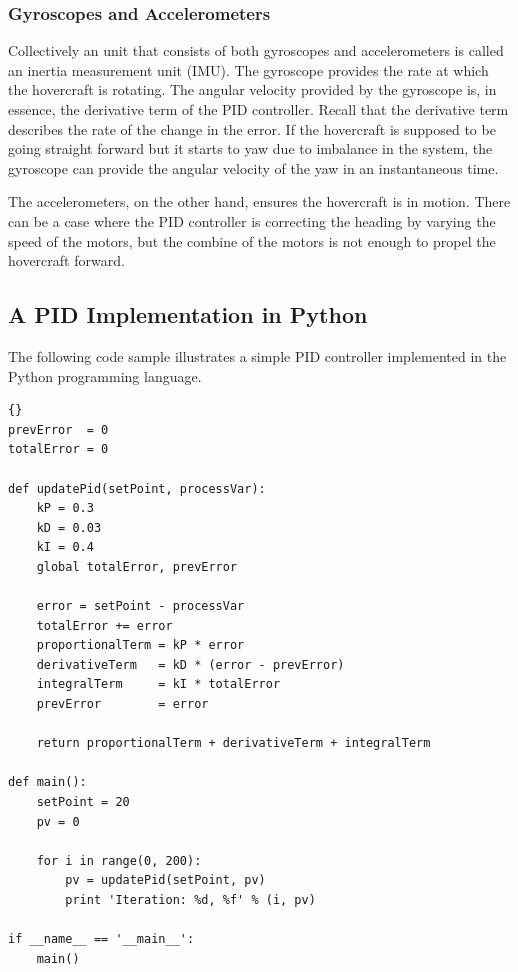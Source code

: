 \subsubsection{Gyroscopes and Accelerometers}
Collectively an unit that consists of both gyroscopes and accelerometers is called an inertia measurement unit (IMU). The gyroscope provides the rate at which the hovercraft is rotating. The angular velocity provided by the gyroscope is, in essence, the derivative term of the PID controller. Recall that the derivative term describes the rate of the change in the error. If the hovercraft is supposed to be going straight forward but it starts to yaw due to imbalance in the system, the gyroscope can provide the angular velocity of the yaw in an instantaneous time.

The accelerometers, on the other hand, ensures the hovercraft is in motion. There can be a case where the PID controller is correcting the heading by varying the speed of the motors, but the combine of the motors is not enough to propel the hovercraft forward.

\subsection{A PID Implementation in Python}
The following code sample illustrates a simple PID controller implemented in the Python programming language.  
\lstset{language=python}
\begin{lstlisting}[frame=trbl]{}
prevError  = 0
totalError = 0

def updatePid(setPoint, processVar):  
	kP = 0.3  
	kD = 0.03  
	kI = 0.4  
	global totalError, prevError  
  
	error = setPoint - processVar  
	totalError += error  
	proportionalTerm = kP * error  
	derivativeTerm   = kD * (error - prevError)  
	integralTerm     = kI * totalError  
	prevError        = error  
  
	return proportionalTerm + derivativeTerm + integralTerm  
  
def main():  
	setPoint = 20  
	pv = 0  
    
	for i in range(0, 200):  
		pv = updatePid(setPoint, pv)  
		print 'Iteration: %d, %f' % (i, pv)

if __name__ == '__main__':  
	main()
\end{lstlisting}

